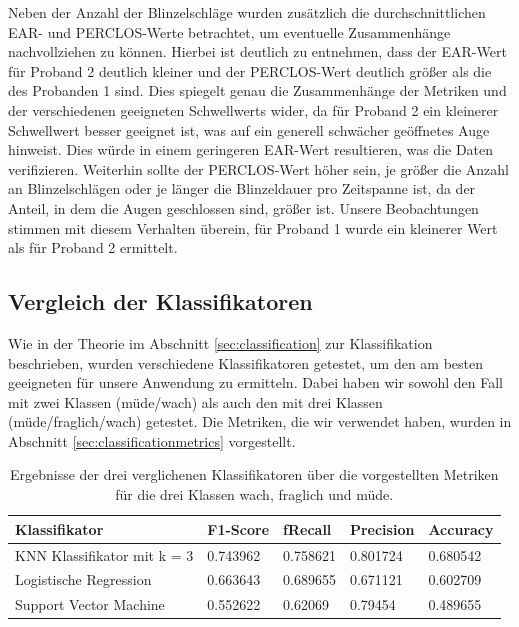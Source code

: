 Neben der Anzahl der Blinzelschläge wurden zusätzlich die durchschnittlichen EAR- und PERCLOS-Werte betrachtet, um eventuelle Zusammenhänge nachvollziehen zu können. Hierbei ist deutlich zu entnehmen, dass der EAR-Wert für Proband 2 deutlich kleiner und der PERCLOS-Wert deutlich größer als die des Probanden 1 sind. Dies spiegelt genau die Zusammenhänge der Metriken und der verschiedenen geeigneten Schwellwerts wider, da für Proband 2 ein kleinerer Schwellwert besser geeignet ist, was auf ein generell schwächer geöffnetes Auge hinweist. Dies würde in einem geringeren EAR-Wert resultieren, was die Daten verifizieren. Weiterhin sollte der PERCLOS-Wert höher sein, je größer die Anzahl an Blinzelschlägen oder je länger die Blinzeldauer pro Zeitspanne ist, da der Anteil, in dem die Augen geschlossen sind, größer ist. Unsere Beobachtungen stimmen mit diesem Verhalten überein, für Proband 1 wurde ein kleinerer Wert als für Proband 2 ermittelt.

\subsection{Vergleich der Klassifikatoren}
\label{subsec:classificatorcomparison}
Wie in der Theorie im Abschnitt \ref{sec:classification} zur Klassifikation beschrieben, wurden verschiedene Klassifikatoren getestet, um den am besten geeigneten für unsere Anwendung zu ermitteln. Dabei haben wir sowohl den Fall mit zwei Klassen (müde/wach) als auch den mit drei Klassen (müde/fraglich/wach) getestet. Die Metriken, die wir verwendet haben, wurden in Abschnitt \ref{sec:classificationmetrics} vorgestellt.

\begin{table}
    \centering
    \begin{tabular}{|l|l|l|l|l|}
    \hline
        {Klassifikator} & {F1-Score} & f{Recall} & {Precision} & {Accuracy} \\ \hline
        {KNN Klassifikator mit k = 3} & 0.743962 & 0.758621 & 0.801724 & 0.680542 \\ \hline
        {Logistische Regression} & 0.663643 & 0.689655 & 0.671121 & 0.602709 \\ \hline
        {Support Vector Machine} & 0.552622 & 0.62069 & 0.79454 & 0.489655 \\ \hline
    \end{tabular}
\caption{Ergebnisse der drei verglichenen Klassifikatoren über die vorgestellten Metriken für die drei Klassen wach, fraglich und müde.}
\label{table:threeclassificator}
\end{table}

